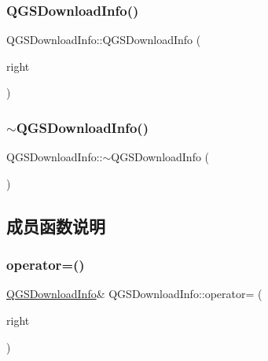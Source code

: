 \subsubsection{\texorpdfstring{Q\+G\+S\+Download\+Info()}{QGSDownloadInfo()}\hspace{0.1cm}{\footnotesize\ttfamily [3/3]}}
{\footnotesize\ttfamily Q\+G\+S\+Download\+Info\+::\+Q\+G\+S\+Download\+Info (\begin{DoxyParamCaption}\item[{\mbox{\hyperlink{class_q_g_s_download_info}{Q\+G\+S\+Download\+Info}} \&\&}]{right }\end{DoxyParamCaption})\hspace{0.3cm}{\ttfamily [default]}}

\mbox{\label{class_q_g_s_download_info_a9fba36dfd321fe980a8fd57eadf5dea1}} 
\subsubsection{\texorpdfstring{$\sim$\+Q\+G\+S\+Download\+Info()}{~QGSDownloadInfo()}}
{\footnotesize\ttfamily Q\+G\+S\+Download\+Info\+::$\sim$\+Q\+G\+S\+Download\+Info (\begin{DoxyParamCaption}{ }\end{DoxyParamCaption})\hspace{0.3cm}{\ttfamily [virtual]}}



\subsection{成员函数说明}
\mbox{\label{class_q_g_s_download_info_a8f7ae80774603f7c0b52de184b82eb63}} 
\subsubsection{\texorpdfstring{operator=()}{operator=()}\hspace{0.1cm}{\footnotesize\ttfamily [1/2]}}
{\footnotesize\ttfamily \mbox{\hyperlink{class_q_g_s_download_info}{Q\+G\+S\+Download\+Info}}\& Q\+G\+S\+Download\+Info\+::operator= (\begin{DoxyParamCaption}\item[{const \mbox{\hyperlink{class_q_g_s_download_info}{Q\+G\+S\+Download\+Info}} \&}]{right }\end{DoxyParamCaption})\hspace{0.3cm}{\ttfamily [default]}}

